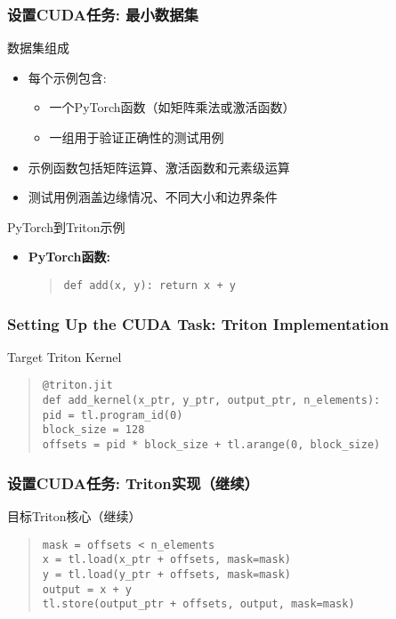 \documentclass[aspectratio=169]{beamer}
\begin{document}
\begin{frame}
	\frametitle{设置CUDA任务: 最小数据集}
	\begin{block}{数据集组成}
		\begin{itemize}
			\item 每个示例包含:
			\begin{itemize}
				\item 一个PyTorch函数（如矩阵乘法或激活函数）
				\item 一组用于验证正确性的测试用例
			\end{itemize}
			\item 示例函数包括矩阵运算、激活函数和元素级运算
			\item 测试用例涵盖边缘情况、不同大小和边界条件
		\end{itemize}
	\end{block}
	\begin{block}{PyTorch到Triton示例}
	\begin{itemize}
		\item \textbf{PyTorch函数:}
		\begin{quote}
		\texttt{def add(x, y): return x + y}
		\end{quote}
	\end{itemize}
	\end{block}
\end{frame}

\begin{frame}
	\frametitle{Setting Up the CUDA Task: Triton Implementation}
	\begin{block}{Target Triton Kernel}
	\begin{quote}
	\texttt{@triton.jit}\\  
	\texttt{def add\_kernel(x\_ptr, y\_ptr, output\_ptr, n\_elements):}\\  
	\texttt{\phantom{xxxx}pid = tl.program\_id(0)}\\  
	\texttt{\phantom{xxxx}block\_size = 128}\\  
	\texttt{\phantom{xxxx}offsets = pid * block\_size + tl.arange(0, block\_size)}
	\end{quote}
	\end{block}
\end{frame}

\begin{frame}
	\frametitle{设置CUDA任务: Triton实现（继续）}
	\begin{block}{目标Triton核心（继续）}
	\begin{quote}
	\texttt{\phantom{xxxx}mask = offsets < n\_elements}\\  
	\texttt{\phantom{xxxx}x = tl.load(x\_ptr + offsets, mask=mask)}\\  
	\texttt{\phantom{xxxx}y = tl.load(y\_ptr + offsets, mask=mask)}\\  
	\texttt{\phantom{xxxx}output = x + y}\\  
	\texttt{\phantom{xxxx}tl.store(output\_ptr + offsets, output, mask=mask)}
	\end{quote}
	\end{block}
\end{frame}
\end{document}
